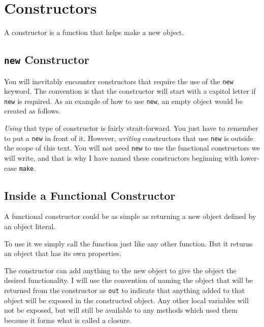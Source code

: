 \chapter{Constructors}

A constructor is a function that helps make a new object.


\section{\texttt{new} Constructor}


You will inevitably encounter constructors that require the use of the \texttt{new} keyword. The convention is that the constructor will start with a capitol letter if \texttt{new} is required. As an example of how to use \texttt{new}, an empty object would be created as follows.


\textit{Using} that type of constructor is fairly strait-forward. You just have to remember to put a \texttt{new} in front of it. However, \textit{writing} constructors that use \texttt{new} is outside the scope of this text. You will not need \texttt{new} to use the functional constructors we will write, and that is why I have named these constructors beginning with lower-case \texttt{make}.

\section{Inside a Functional Constructor}

A functional constructor could be as simple as returning a new object defined by an object literal.


To use it we simply call the function just like any other function. But it returns an object that has its own properties.



The constructor can add anything to the new object to give the object the desired functionality. I will use the convention of naming the object that will be returned from the constructor as \texttt{out} to indicate that anything added to that object will be exposed in the constructed object. Any other local variables will not be exposed, but will still be available to any methods which used them because it forms what is called a closure.

